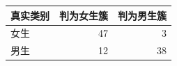 \begin{tabular}{lrr}
\toprule
真实类别 & 判为女生簇 & 判为男生簇 \\
\midrule
女生 & 47 & 3 \\
男生 & 12 & 38 \\
\bottomrule
\end{tabular}

